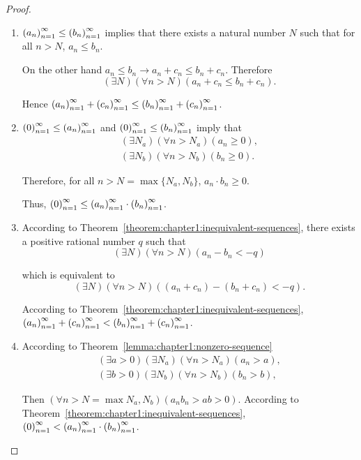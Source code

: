 \begin{proof}
    \begin{enumerate}[label={(\roman*)}]
        \item ${\left({a_{n}}\right)}^{\infty}_{n=1}\le{\left({b_{n}}\right)}^{\infty}_{n=1}$ implies that there exists a natural number $N$ such that for all $n > N$, $a_{n}\le b_{n}$.

              On the other hand $a_{n}\le b_{n}\rightarrow a_{n} + c_{n}\le b_{n} + c_{n}$. Therefore
              \[
                  (\exists N)(\forall n > N)(a_{n} + c_{n}\le b_{n} + c_{n}).
              \]

              Hence ${\left({a_{n}}\right)}^{\infty}_{n=1} + {\left({c_{n}}\right)}^{\infty}_{n=1}\le{\left({b_{n}}\right)}^{\infty}_{n=1} + {\left({c_{n}}\right)}^{\infty}_{n=1}$.
        \item ${\left({0}\right)}^{\infty}_{n=1}\le{\left({a_{n}}\right)}^{\infty}_{n=1}$ and ${\left({0}\right)}^{\infty}_{n=1}\le{\left({b_{n}}\right)}^{\infty}_{n=1}$ imply that
              \[
                  \begin{split}
                      (\exists N_{a})(\forall n > N_{a})(a_{n}\ge 0), \\
                      (\exists N_{b})(\forall n > N_{b})(b_{n}\ge 0).
                  \end{split}
              \]

              Therefore, for all $n > N = \max\{ N_{a}, N_{b} \}$, $a_{n}\cdot b_{n}\ge 0$.

              Thus, ${\left({0}\right)}^{\infty}_{n=1}\le{\left({a_{n}}\right)}^{\infty}_{n=1}\cdot{\left({b_{n}}\right)}^{\infty}_{n=1}$.
        \item According to Theorem~\ref{theorem:chapter1:inequivalent-sequences}, there exists a positive rational number $q$ such that
              \[
                  (\exists N)(\forall n > N)(a_{n} - b_{n} < -q)
              \]

              which is equivalent to
              \[
                  (\exists N)(\forall n > N)((a_{n} + c_{n}) - (b_{n} + c_{n}) < -q).
              \]

              According to Theorem~\ref{theorem:chapter1:inequivalent-sequences}, ${\left({a_{n}}\right)}^{\infty}_{n=1} + {\left({c_{n}}\right)}^{\infty}_{n=1} < {\left({b_{n}}\right)}^{\infty}_{n=1} + {\left({c_{n}}\right)}^{\infty}_{n=1}$.
        \item According to Theorem~\ref{lemma:chapter1:nonzero-sequence}
              \[
                  \begin{split}
                      (\exists a > 0)(\exists N_{a})(\forall n > N_{a})(a_{n} > a), \\
                      (\exists b > 0)(\exists N_{b})(\forall n > N_{b})(b_{n} > b),
                  \end{split}
              \]

              Then $(\forall n > N = \max{N_{a}, N_{b}})(a_{n}b_{n} > ab > 0)$. According to Theorem~\ref{theorem:chapter1:inequivalent-sequences}, ${\left({0}\right)}^{\infty}_{n=1} < {\left({a_{n}}\right)}^{\infty}_{n=1}\cdot{\left({b_{n}}\right)}^{\infty}_{n=1}$.\qedhere
    \end{enumerate}
\end{proof}

